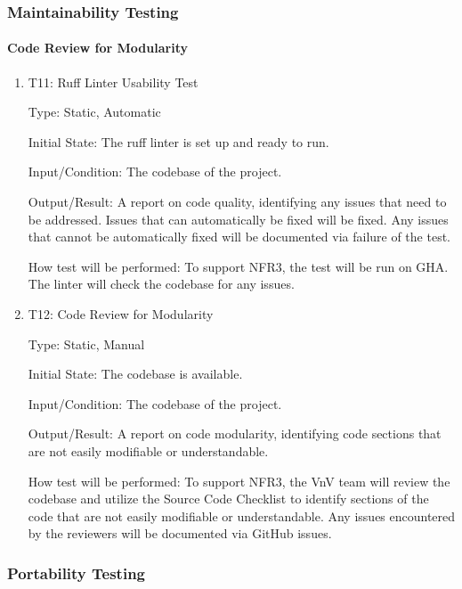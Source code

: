 \documentclass[12pt, titlepage]{article}
\begin{document}
\subsubsection{Maintainability Testing}

\paragraph{Code Review for Modularity}

\begin{enumerate}

\item{T11: Ruff Linter Usability Test\\}

Type: Static, Automatic

Initial State: The ruff linter is set up and ready to run.

Input/Condition: The codebase of the \progname{} project.

Output/Result: A report on code quality, identifying any issues that need to be
addressed. Issues that can automatically be fixed will be fixed. Any issues that
cannot be automatically fixed will be documented via failure of the test.

How test will be performed: To support NFR3, the test will be run on GHA. The
linter will check the codebase for any issues.

\item{T12: Code Review for Modularity\\}

Type: Static, Manual
					
Initial State: The codebase is available.
					
Input/Condition: The codebase of the \progname{} project.
					
Output/Result: A report on code modularity, identifying code sections that are
not easily modifiable or understandable.
					
How test will be performed: To support NFR3, the VnV team will review the codebase
and utilize the Source Code Checklist \citep{CodeChecklist} to identify
sections of the code that are not easily modifiable or understandable. Any issues
encountered by the reviewers will be documented via GitHub issues.
\end{enumerate}

\subsubsection{Portability Testing}
\end{document}
